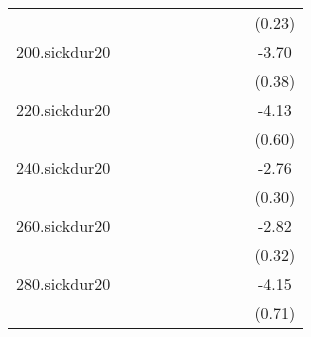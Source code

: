 \documentclass{article}
\begin{document}
{\begin{tabular}{l*{9}{c}}
            &                     &                     &                     &                     &                     &                     &                     &                     &      (0.23)         \\
[1em]
200.sickdur20&                     &                     &                     &                     &                     &                     &                     &                     &       -3.70\sym{***}\\
            &                     &                     &                     &                     &                     &                     &                     &                     &      (0.38)         \\
[1em]
220.sickdur20&                     &                     &                     &                     &                     &                     &                     &                     &       -4.13\sym{***}\\
            &                     &                     &                     &                     &                     &                     &                     &                     &      (0.60)         \\
[1em]
240.sickdur20&                     &                     &                     &                     &                     &                     &                     &                     &       -2.76\sym{***}\\
            &                     &                     &                     &                     &                     &                     &                     &                     &      (0.30)         \\
[1em]
260.sickdur20&                     &                     &                     &                     &                     &                     &                     &                     &       -2.82\sym{***}\\
            &                     &                     &                     &                     &                     &                     &                     &                     &      (0.32)         \\
[1em]
280.sickdur20&                     &                     &                     &                     &                     &                     &                     &                     &       -4.15\sym{***}\\
            &                     &                     &                     &                     &                     &                     &                     &                     &      (0.71)         \\

\end{tabular}}
\end{document}
